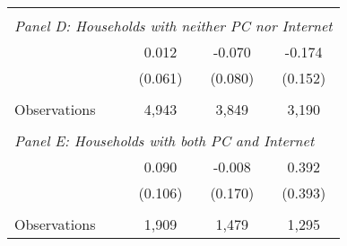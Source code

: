 {\begin{tabular}{lccc}
&  &  &   \\
\multicolumn{4}{l}{\textit{Panel D: Households with neither PC nor Internet}} \\
\hspace{3mm}        &       0.012   &      -0.070   &      -0.174   \\
                    &     (0.061)   &     (0.080)   &     (0.152)   \\
                    &               &               &               \\
\hspace{3mm}Observations&       4,943   &       3,849   &       3,190   \\
 
&  &  &   \\
\multicolumn{4}{l}{\textit{Panel E: Households with both PC and Internet}} \\
\hspace{3mm}        &       0.090   &      -0.008   &       0.392   \\
                    &     (0.106)   &     (0.170)   &     (0.393)   \\
                    &               &               &               \\
\hspace{3mm}Observations&       1,909   &       1,479   &       1,295   \\
 

\bottomrule
\end{tabular}
}

